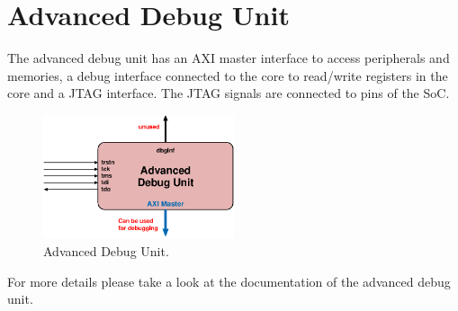 \chapter{Advanced Debug Unit}

The advanced debug unit has an AXI master interface to access peripherals and
memories, a debug interface connected to the core to read/write registers in the
core and a JTAG interface.
The JTAG signals are connected to pins of the SoC.

\begin{figure}[H]
  \centering
  \includegraphics[width=0.5\textwidth]{./figures/adv_dbg_unit}
  \caption{Advanced Debug Unit.}
  \label{fig:adv_dbg_unit}
\end{figure}

For more details please take a look at the documentation of the advanced debug unit.

